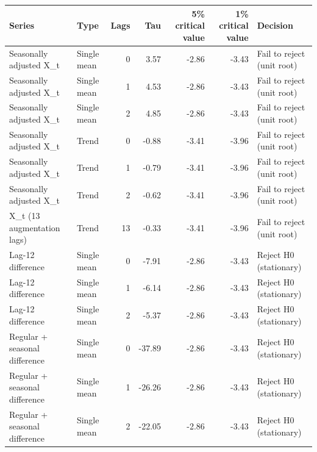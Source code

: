 
\begin{tabular}[t]{llrrrrl}
\toprule
Series & Type & Lags & Tau & 5\% critical value & 1\% critical value & Decision\\
\midrule
Seasonally adjusted X\_t & Single mean & 0 & 3.57 & -2.86 & -3.43 & Fail to reject (unit root)\\
Seasonally adjusted X\_t & Single mean & 1 & 4.53 & -2.86 & -3.43 & Fail to reject (unit root)\\
Seasonally adjusted X\_t & Single mean & 2 & 4.85 & -2.86 & -3.43 & Fail to reject (unit root)\\
Seasonally adjusted X\_t & Trend & 0 & -0.88 & -3.41 & -3.96 & Fail to reject (unit root)\\
Seasonally adjusted X\_t & Trend & 1 & -0.79 & -3.41 & -3.96 & Fail to reject (unit root)\\
Seasonally adjusted X\_t & Trend & 2 & -0.62 & -3.41 & -3.96 & Fail to reject (unit root)\\
X\_t (13 augmentation lags) & Trend & 13 & -0.33 & -3.41 & -3.96 & Fail to reject (unit root)\\
Lag-12 difference & Single mean & 0 & -7.91 & -2.86 & -3.43 & Reject H0 (stationary)\\
Lag-12 difference & Single mean & 1 & -6.14 & -2.86 & -3.43 & Reject H0 (stationary)\\
Lag-12 difference & Single mean & 2 & -5.37 & -2.86 & -3.43 & Reject H0 (stationary)\\
Regular + seasonal difference & Single mean & 0 & -37.89 & -2.86 & -3.43 & Reject H0 (stationary)\\
Regular + seasonal difference & Single mean & 1 & -26.26 & -2.86 & -3.43 & Reject H0 (stationary)\\
Regular + seasonal difference & Single mean & 2 & -22.05 & -2.86 & -3.43 & Reject H0 (stationary)\\
\bottomrule
\end{tabular}
